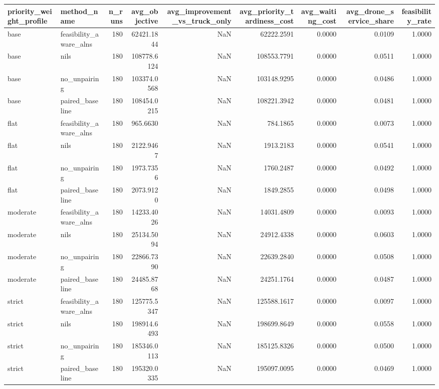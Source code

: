 \begin{tabular}{llrrrrrrr}
\toprule
priority_weight_profile & method_name & n_runs & avg_objective & avg_improvement_vs_truck_only & avg_priority_tardiness_cost & avg_waiting_cost & avg_drone_service_share & feasibility_rate \\
\midrule
base & feasibility_aware_alns & 180 & 62421.1844 & NaN & 62222.2591 & 0.0000 & 0.0109 & 1.0000 \\
base & nils & 180 & 108778.6124 & NaN & 108553.7791 & 0.0000 & 0.0511 & 1.0000 \\
base & no_unpairing & 180 & 103374.0568 & NaN & 103148.9295 & 0.0000 & 0.0486 & 1.0000 \\
base & paired_baseline & 180 & 108454.0215 & NaN & 108221.3942 & 0.0000 & 0.0481 & 1.0000 \\
flat & feasibility_aware_alns & 180 & 965.6630 & NaN & 784.1865 & 0.0000 & 0.0073 & 1.0000 \\
flat & nils & 180 & 2122.9467 & NaN & 1913.2183 & 0.0000 & 0.0541 & 1.0000 \\
flat & no_unpairing & 180 & 1973.7356 & NaN & 1760.2487 & 0.0000 & 0.0492 & 1.0000 \\
flat & paired_baseline & 180 & 2073.9120 & NaN & 1849.2855 & 0.0000 & 0.0498 & 1.0000 \\
moderate & feasibility_aware_alns & 180 & 14233.4026 & NaN & 14031.4809 & 0.0000 & 0.0093 & 1.0000 \\
moderate & nils & 180 & 25134.5094 & NaN & 24912.4338 & 0.0000 & 0.0603 & 1.0000 \\
moderate & no_unpairing & 180 & 22866.7390 & NaN & 22639.2840 & 0.0000 & 0.0508 & 1.0000 \\
moderate & paired_baseline & 180 & 24485.8768 & NaN & 24251.1764 & 0.0000 & 0.0487 & 1.0000 \\
strict & feasibility_aware_alns & 180 & 125775.5347 & NaN & 125588.1617 & 0.0000 & 0.0097 & 1.0000 \\
strict & nils & 180 & 198914.6493 & NaN & 198699.8649 & 0.0000 & 0.0558 & 1.0000 \\
strict & no_unpairing & 180 & 185346.0113 & NaN & 185125.8326 & 0.0000 & 0.0500 & 1.0000 \\
strict & paired_baseline & 180 & 195320.0335 & NaN & 195097.0095 & 0.0000 & 0.0469 & 1.0000 \\
\bottomrule
\end{tabular}
